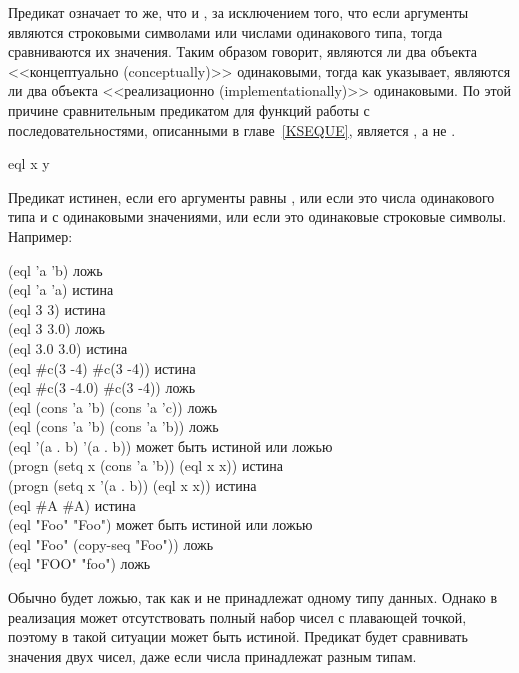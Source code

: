 \begin{defun}[Функция]
Предикат  означает то же, что и , за исключением того, что если
аргументы являются строковыми символами или числами одинакового типа, тогда
сравниваются их значения. Таким образом  говорит, являются ли два объекта
<<концептуально (conceptually)>> одинаковыми, тогда как  указывает, являются ли два
объекта <<реализационно (implementationally)>> одинаковыми. По этой причине
сравнительным предикатом для функций работы с последовательностями, описанными в
главе~\ref{KSEQUE}, является , а не .
\end{defun}

\begin{defun}[Функция]
eql x y

Предикат  истинен, если его аргументы равны , или 
если это числа одинакового типа и с одинаковыми значениями, или если это
одинаковые строковые символы.
Например:
\begin{lisp}
(eql 'a 'b) \textrm{ложь} \\
(eql 'a 'a) \textrm{истина} \\
(eql 3 3) \textrm{истина} \\
(eql 3 3.0) \textrm{ложь} \\
(eql 3.0 3.0) \textrm{истина} \\
(eql \#c(3 -4) \#c(3 -4)) \textrm{истина} \\
(eql \#c(3 -4.0) \#c(3 -4)) \textrm{ложь} \\
(eql (cons 'a 'b) (cons 'a 'c)) \textrm{ложь} \\
(eql (cons 'a 'b) (cons 'a 'b)) \textrm{ложь} \\
(eql '(a . b) '(a . b)) \textrm{может быть истиной или ложью} \\
(progn (setq x (cons 'a 'b)) (eql x x)) \textrm{истина} \\
(progn (setq x '(a . b)) (eql x x)) \textrm{истина} \\
(eql \#{\Xbackslash}A \#{\Xbackslash}A) \textrm{истина} \\
(eql "Foo" "Foo") \textrm{может быть истиной или ложью} \\
(eql "Foo" (copy-seq "Foo")) \textrm{ложь} \\
(eql "FOO" "foo") \textrm{ложь}
\end{lisp}

Обычно  будет ложью, так как  и  не
принадлежат одному типу данных. Однако в реализация может отсутствовать полный
набор чисел с плавающей точкой, поэтому в такой ситуации 
может быть истиной. Предикат \cdf{=} будет сравнивать значения двух чисел, даже
если числа принадлежат разным типам.


\end{defun}
